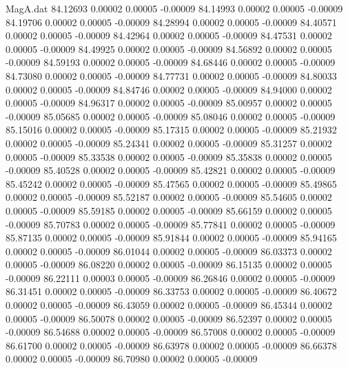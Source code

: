 \begin{filecontents}{MagA.dat}
  84.12693    0.00002    0.00005   -0.00009
  84.14993    0.00002    0.00005   -0.00009
  84.19706    0.00002    0.00005   -0.00009
  84.28994    0.00002    0.00005   -0.00009
  84.40571    0.00002    0.00005   -0.00009
  84.42964    0.00002    0.00005   -0.00009
  84.47531    0.00002    0.00005   -0.00009
  84.49925    0.00002    0.00005   -0.00009
  84.56892    0.00002    0.00005   -0.00009
  84.59193    0.00002    0.00005   -0.00009
  84.68446    0.00002    0.00005   -0.00009
  84.73080    0.00002    0.00005   -0.00009
  84.77731    0.00002    0.00005   -0.00009
  84.80033    0.00002    0.00005   -0.00009
  84.84746    0.00002    0.00005   -0.00009
  84.94000    0.00002    0.00005   -0.00009
  84.96317    0.00002    0.00005   -0.00009
  85.00957    0.00002    0.00005   -0.00009
  85.05685    0.00002    0.00005   -0.00009
  85.08046    0.00002    0.00005   -0.00009
  85.15016    0.00002    0.00005   -0.00009
  85.17315    0.00002    0.00005   -0.00009
  85.21932    0.00002    0.00005   -0.00009
  85.24341    0.00002    0.00005   -0.00009
  85.31257    0.00002    0.00005   -0.00009
  85.33538    0.00002    0.00005   -0.00009
  85.35838    0.00002    0.00005   -0.00009
  85.40528    0.00002    0.00005   -0.00009
  85.42821    0.00002    0.00005   -0.00009
  85.45242    0.00002    0.00005   -0.00009
  85.47565    0.00002    0.00005   -0.00009
  85.49865    0.00002    0.00005   -0.00009
  85.52187    0.00002    0.00005   -0.00009
  85.54605    0.00002    0.00005   -0.00009
  85.59185    0.00002    0.00005   -0.00009
  85.66159    0.00002    0.00005   -0.00009
  85.70783    0.00002    0.00005   -0.00009
  85.77841    0.00002    0.00005   -0.00009
  85.87135    0.00002    0.00005   -0.00009
  85.91844    0.00002    0.00005   -0.00009
  85.94165    0.00002    0.00005   -0.00009
  86.01044    0.00002    0.00005   -0.00009
  86.03373    0.00002    0.00005   -0.00009
  86.08220    0.00002    0.00005   -0.00009
  86.15135    0.00002    0.00005   -0.00009
  86.22111    0.00003    0.00005   -0.00009
  86.26846    0.00002    0.00005   -0.00009
  86.31451    0.00002    0.00005   -0.00009
  86.33753    0.00002    0.00005   -0.00009
  86.40672    0.00002    0.00005   -0.00009
  86.43059    0.00002    0.00005   -0.00009
  86.45344    0.00002    0.00005   -0.00009
  86.50078    0.00002    0.00005   -0.00009
  86.52397    0.00002    0.00005   -0.00009
  86.54688    0.00002    0.00005   -0.00009
  86.57008    0.00002    0.00005   -0.00009
  86.61700    0.00002    0.00005   -0.00009
  86.63978    0.00002    0.00005   -0.00009
  86.66378    0.00002    0.00005   -0.00009
  86.70980    0.00002    0.00005   -0.00009

\end{filecontents}
